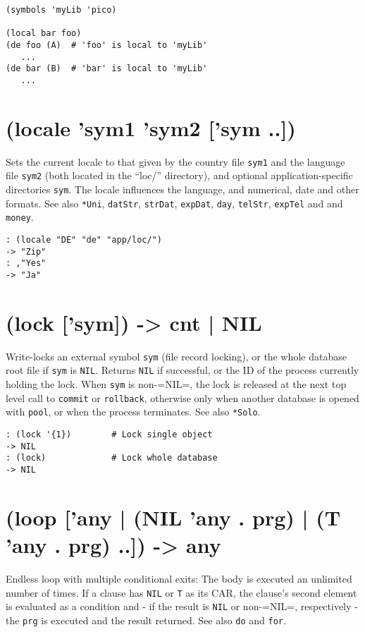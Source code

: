 {{{{{{\begin{verbatim}
(symbols 'myLib 'pico)

(local bar foo)
(de foo (A)  # 'foo' is local to 'myLib'
   ...
(de bar (B)  # 'bar' is local to 'myLib'
   ...
\end{verbatim}

 
\section{(locale 'sym1 'sym2 ['sym ..])}
\label{sec-8-1-12-27}


Sets the current locale to that given by the country file \texttt{sym1} and the
language file \texttt{sym2} (both located in the ``loc/'' directory), and
optional application-specific directories \texttt{sym}. The locale influences
the language, and numerical, date and other formats. See also \texttt{*Uni},
\texttt{datStr}, \texttt{strDat}, \texttt{expDat}, \texttt{day}, \texttt{telStr}, \texttt{expTel} and and \texttt{money}.


\begin{verbatim}
: (locale "DE" "de" "app/loc/")
-> "Zip"
: ,"Yes"
-> "Ja"
\end{verbatim}

 
\section{(lock ['sym]) -> cnt | NIL}
\label{sec-8-1-12-28}


Write-locks an external symbol \texttt{sym} (file record locking), or the whole
database root file if \texttt{sym} is \texttt{NIL}. Returns \texttt{NIL} if successful, or
the ID of the process currently holding the lock. When \texttt{sym} is
non-=NIL=, the lock is released at the next top level call to \texttt{commit}
or \texttt{rollback}, otherwise only when another database is opened with
\texttt{pool}, or when the process terminates. See also \texttt{*Solo}.


\begin{verbatim}
: (lock '{1})        # Lock single object
-> NIL
: (lock)             # Lock whole database
-> NIL
\end{verbatim}

 
\section{(loop ['any | (NIL 'any . prg) | (T 'any . prg) ..]) -> any}
\label{sec-8-1-12-29}


Endless loop with multiple conditional exits: The body is executed an
unlimited number of times. If a clause has \texttt{NIL} or \texttt{T} as its CAR, the
clause's second element is evaluated as a condition and - if the result
is \texttt{NIL} or non-=NIL=, respectively - the \texttt{prg} is executed and the
result returned. See also \texttt{do} and \texttt{for}.


}}}}}}
